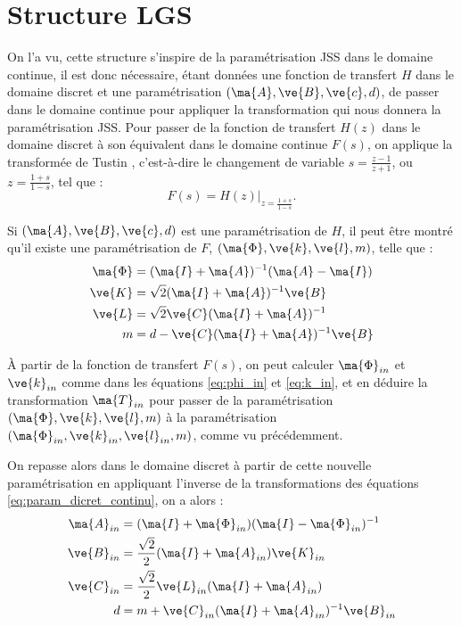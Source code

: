 \section{Structure LGS\label{anx:LGS}}
On l'a vu, cette structure s'inspire de la paramétrisation JSS dans le domaine continue, il est donc nécessaire, étant données une fonction de transfert $H$ dans le domaine discret et une paramétrisation $(\ma{A},\ve{B},\ve{c}, d)$, de passer dans le domaine continue pour appliquer la transformation qui nous donnera la paramétrisation JSS. 
Pour passer de la fonction de transfert $H(z)$ dans le domaine discret à son équivalent dans le domaine continue $F(s)$, on applique la transformée de Tustin \cite{OppSch09}, c'est-à-dire le changement de variable $s=\frac{z-1}{z+1}$, ou $z=\frac{1+s}{1-s}$, tel que :
\begin{equation}
	F(s) = H(z)|_{z=\frac{1+s}{1-s}}.
\end{equation}

Si $(\ma{A},\ve{B},\ve{c}, d)$ est une paramétrisation de $H$, il peut être montré qu'il existe une paramétrisation de $F$, $(\ma{\Phi}, \ve{k}, \ve{l},m)$, telle que :
\begin{subequations}
	\begin{align}
		\ma{\Phi} &= (\ma{I}+\ma{A})^{-1}(\ma{A}-\ma{I})\\
		\ve{K} &= \sqrt{2}(\ma{I}+\ma{A})^{-1}\ve{B}\\
		\ve{L} &= \sqrt{2}\ve{C}(\ma{I}+\ma{A})^{-1}\\
		m &= d-\ve{C}(\ma{I}+\ma{A})^{-1}\ve{B}
	\end{align}
	\label{eq:param_dicret_continu}
\end{subequations}

À partir de la fonction de transfert $F(s)$, on peut calculer $\ma{\Phi}_{in}$ et $\ve{k}_{in}$ comme dans les équations \eqref{eq:phi_in} et \eqref{eq:k_in}, et en déduire la transformation $\ma{T}_{in}$ pour passer de la paramétrisation $(\ma{\Phi}, \ve{k}, \ve{l},m)$ à la paramétrisation $(\ma{\Phi}_{in}, \ve{k}_{in}, \ve{l}_{in},m)$, comme vu précédemment.

On repasse alors dans le domaine discret à partir de cette nouvelle paramétrisation en appliquant l'inverse de la transformations des équations \eqref{eq:param_dicret_continu}, on a alors :
\begin{subequations}
	\begin{align}
		\ma{A}_{in}&=(\ma{I}+\ma{\Phi}_{in})(\ma{I}-\ma{\Phi}_{in})^{-1}\label{eq:A_in}\\
		\ve{B}_{in}&=\frac{\sqrt{2}}{2}(\ma{I}+\ma{A}_{in})\ve{K}_{in}\\
		\ve{C}_{in}&=\frac{\sqrt{2}}{2}\ve{L}_{in}(\ma{I}+\ma{A}_{in})\\
		d&=m+\ve{C}_{in}(\ma{I}+\ma{A}_{in})^{-1}\ve{B}_{in}
	\end{align}
	\label{eq:param_continu_discret}
\end{subequations}


